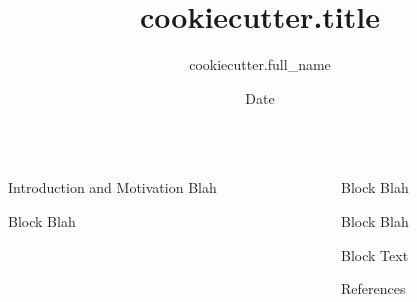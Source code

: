 \documentclass[final]{beamer}
\title[{{ cookiecutter.title_short }}]{ {{ cookiecutter.title }} }
\author[{{ cookiecutter.last_name }}]{ {{ cookiecutter.full_name }} }
\institute[{{ cookiecutter.institute_short }}]{ {{ cookiecutter.institute }} }
\date{Date}
\begin{document}
\begin{frame}[fragile]
\begin{columns}[T]

    \begin{column}{.47\textwidth}

            \begin{block}{Introduction and Motivation}
                Blah \cite{whitehead1912principia}
            \end{block}


            \begin{block}{Block}
                Blah
            \end{block}

    \end{column}

    \begin{column}{.47\textwidth}

            \begin{block}{Block}
                Blah
            \end{block}

            \begin{block}{Block}
                Blah
            \end{block}

            \begin{block}{Block}
                Text
            \end{block}

            \begin{block}{References}
                \footnotesize
                
                
            \end{block}

    \end{column}

\end{columns}
\end{frame}
\end{document}
